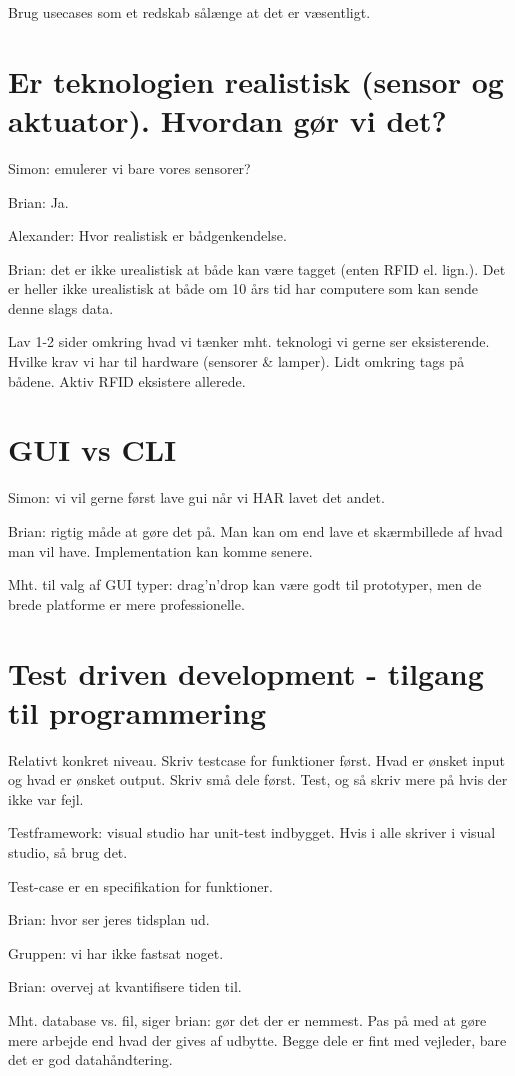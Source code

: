 \documentclass{article}
\begin{document}
Brug usecases som et redskab sålænge at det er væsentligt.

\section{Er teknologien realistisk (sensor og aktuator). Hvordan gør vi det?}

Simon: emulerer vi bare vores sensorer?

Brian: Ja.

Alexander: Hvor realistisk er bådgenkendelse.

Brian: det er ikke urealistisk at både kan være tagget (enten RFID el. lign.). Det er heller ikke urealistisk at både om 10 års tid har computere som kan sende denne slags data. 

Lav 1-2 sider omkring hvad vi tænker mht. teknologi vi gerne ser eksisterende. Hvilke krav vi har til hardware (sensorer \& lamper). Lidt omkring tags på bådene. Aktiv RFID eksistere allerede. 

\section{GUI vs CLI}

Simon: vi vil gerne først lave gui når vi HAR lavet det andet.

Brian: rigtig måde at gøre det på. Man kan om end lave et skærmbillede af hvad man vil have. Implementation kan komme senere.

Mht. til valg af GUI typer: drag'n'drop kan være godt til prototyper, men de brede platforme er mere professionelle.

\section{Test driven development - tilgang til programmering}

Relativt konkret niveau. Skriv testcase for funktioner først. Hvad er ønsket input og hvad er ønsket output. Skriv små dele først. Test, og så skriv mere på hvis der ikke var fejl.

Testframework: visual studio har unit-test indbygget. Hvis i alle skriver i visual studio, så brug det.

Test-case er en specifikation for funktioner.

Brian: hvor ser jeres tidsplan ud.

Gruppen: vi har ikke fastsat noget.

Brian: overvej at kvantifisere tiden til.

Mht. database vs. fil, siger brian: gør det der er nemmest. Pas på med at gøre mere arbejde end hvad der gives af udbytte. Begge dele er fint med vejleder, bare det er god datahåndtering.
\end{document}
